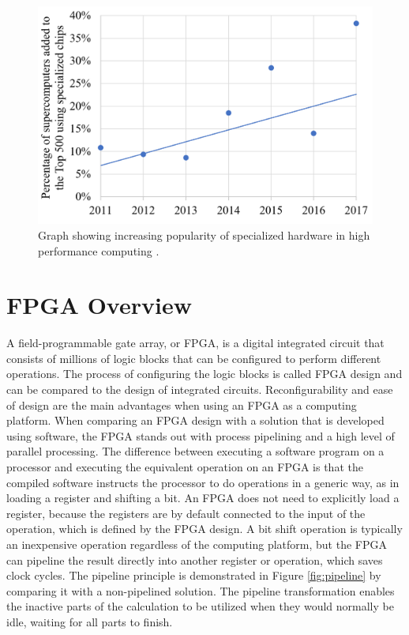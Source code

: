 \documentclass[12pt]{report}
\begin{document}
\begin{figure}
    \centering
    \includegraphics[scale=0.4]{figures/Supercomputers-with-pecialized-chips.png}
    \caption{Graph showing increasing popularity of 
specialized hardware in high performance computing \citep{GenPurpTech}.}
    \label{fig:1}
\end{figure}

\section{FPGA Overview}
A field-programmable gate array, or FPGA, is a digital integrated circuit that consists of millions of logic blocks that can be configured to perform different operations. The process of configuring the logic blocks is called FPGA design and can be compared to the design of integrated circuits. Reconfigurability and ease of design are the main advantages when using an FPGA as a computing platform. When comparing an FPGA design with a solution that is developed using software, the FPGA stands out with process pipelining and a high level of parallel processing. The difference between executing a software program on a processor and executing the equivalent operation on an FPGA is that the compiled software instructs the processor to do operations in a generic way, as in loading a register and shifting a bit. An FPGA does not need to explicitly load a register, because the registers are by default connected to the input of the operation, which is defined by the FPGA design. A bit shift operation is typically an inexpensive operation regardless of the computing platform, but the FPGA can pipeline the result directly into another register or operation, which saves clock cycles. The pipeline principle is demonstrated in Figure \ref{fig:pipeline} by comparing it with a non-pipelined solution. The pipeline transformation enables the inactive parts of the calculation to be utilized when they would normally be idle, waiting for all parts to finish. \citep{XilFPGAIntro}
\end{document}
